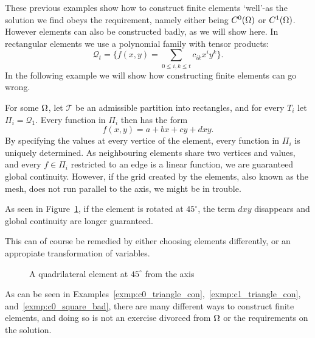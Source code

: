 These previous examples show how to construct finite elements `well'-as 
the solution we find obeys the requirement, namely either being $C^0(\Omega)$ or 
$C^1(\Omega)$. However elements can also be constructed badly, as we will 
show here. In rectangular elements we use a polynomial family with 
tensor products:
\begin{equation*}
    \mathcal{Q}_t = \{ f(x,y)= \sum_{0\leq i,k \leq t} c_{ik}x^i y^k \}.
\end{equation*}
In the following example we will show how constructing finite elements 
can go wrong.
\begin{exmp}{\quad\label{exmp:c0_square_bad}}
   For some $\Omega$, let $\mathcal{T}$ be an admissible partition into 
   rectangles, and for every $T_i$ let $\Pi_i = \mathcal{Q}_1$. 
   Every function in $\Pi_i$ then has the form 
   \begin{equation*}
    f(x,y) = a + bx + cy + dxy.
   \end{equation*}
   By specifying the values at every vertice of the element, every 
   function in $\Pi_i$ is uniquely determined. 
   As neighbouring elements share two vertices and values, and every $f\in\Pi_i$
   restricted to an edge is a linear function, we are guaranteed global 
   continuity. However, if the grid created by the elements, also known as 
   the mesh, does not run parallel to the axis, we might be in trouble.

   As seen in Figure~\ref{fig:quad_element_bad}, if the element is rotated 
   at $45^\circ$, the term $dxy$ disappears and global continuity are longer 
   guaranteed.

   This can of course be remedied by either choosing elements differently, 
   or an appropiate transformation of variables.
\end{exmp}
\begin{figure}[h]
    \centering
    
    \caption{A quadrilateral element at $45^\circ$ from the axis}\label{fig:quad_element_bad}
\end{figure}
As can be seen in Examples~\ref{exmp:c0_triangle_con},~\ref{exmp:c1_triangle_con}, 
and~\ref{exmp:c0_square_bad}, there are many different ways to construct 
finite elements, and doing so is not an exercise divorced from $\Omega$ or 
the requirements on the solution.